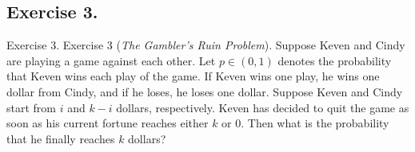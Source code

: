 \documentclass[hyperref={pdfpagelabels=false}]{beamer}
\newcommand{\structb}[1]{\textcolor[rgb]{0.2,0.2,0.7}{#1}}
\begin{document}
\subsection{Exercise 3.}
\begin{frame}{Exercise 3.}
    \justifying
    \structb{Exercise 3 (\emph{The Gambler's Ruin Problem}).} Suppose Keven and Cindy are playing a game against each other. Let $p\in (0, 1)$ denotes the probability that Keven wins each play of the game. If Keven wins one play, he wins one dollar from Cindy, and if he loses, he loses one dollar. Suppose Keven and Cindy start from $i$ and $k-i$ dollars, respectively. Keven has decided to quit the game as soon as his current fortune reaches either $k$ or 0. Then what is the probability that he finally reaches $k$ dollars?
\end{frame}
%
\end{document}
